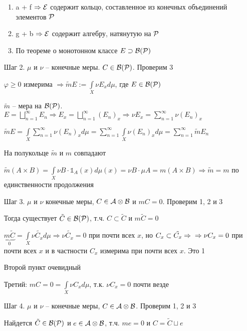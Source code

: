 \documentclass[12pt]{article}
\begin{document}
\begin{enumerate}
\begin{enumerate}
        \item a + f $\Rightarrow \E$ содержит кольцо, составленное из конечных объединений элементов $\P$
        \item g + b $\Rightarrow \E$ содержит алгебру, натянутую на $\P$
        \item По теореме о монотонном классе $E \supset \B(\P)$
    \end{enumerate}

    \item[Шаг 2. ] $\mu$ и $\nu$ -- конечные меры. $C \in \B(\P)$. Проверим 3
    
    $\varphi \geq 0$ измерима $\Rightarrow \tilde{m}E := \int\limits_X \nu E_x d\mu$, где $E \in \B(\P)$

    $\tilde{m}$ -- мера на $\B(\P)$. $E = \bigsqcup\limits_{n = 1}^\infty E_n \Rightarrow E_x = \bigsqcup\limits_{n = 1}^\infty (E_n)_x \Rightarrow \nu E_x = \sum\limits_{n = 1}^\infty \nu (E_n)_x$

    $\tilde{m}E = \int\limits_X \sum\limits_{n = 1}^\infty \nu (E_n)_x d\mu = \sum\limits_{n = 1}^\infty \int\limits_X \nu (E_n)_x d\mu = \sum\limits_{n = 1}^\infty \tilde{m}E_n$

    На полукольце $\tilde{m}$ и $m$ совпадают 

    $\tilde{m}(A \times B) = \int\limits_X \nu B \cdot \mathbb{1}_A(x)d\mu(x) = \nu B \cdot \mu A = m(A \times B) \Rightarrow \tilde{m} = m$ по единственности продолжения 

    \item[Шаг 3. ] $\mu$ и $\nu$ конечные меры, $C \in \A \otimes \B$ и $mC = 0$. Проверим 1, 2 и 3
    
    Тогда существует $\tilde{C} \in \B(\P)$, т.ч. $C \subset \tilde{C}$ и $m\tilde{C} = 0$

    $\underbrace{m\tilde{C}}_0 = \int\limits_X \nu \tilde{C_x}d\mu \Rightarrow \nu \tilde{C_x} = 0$ при почти всех $x$, но $C_x \subset \tilde{C_x} \Rightarrow \\ \Rightarrow \nu C_x = 0$ при почти всех $x$ и в частности $C_x$ измерима при почти всех $x$. Это 1

    Второй пункт очевидный 

    Третий: $m C = 0 = \int\limits_X \nu C_x d\mu$, т.к. $\nu C_x = 0$ почти везде 

    \item[Шаг 4. ] $\mu$ и $\nu$ -- конечные меры, $C \in \A \otimes \B$. Проверим 1, 2 и 3 
    
    Найдется $\tilde{C} \in \B(\P)$ и $e \in \A \otimes \B$, т.ч. $me = 0$ и $C = \tilde{C} \sqcup e$


\end{enumerate}
\end{document}
